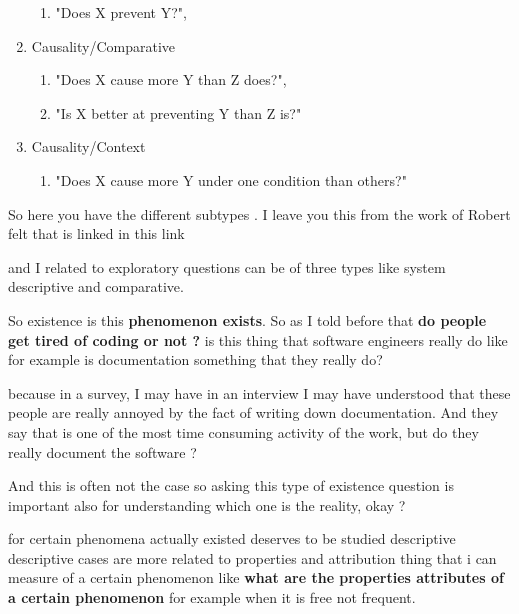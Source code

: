 \documentclass[conference, compsoc, twoside]{IEEEtran}
\begin{document}
\begin{enumerate}
\begin{enumerate}
		\item "Does X prevent Y?",
	\end{enumerate}
	\item Causality/Comparative 
	\begin{enumerate}
		\item "Does X cause more Y than Z does?",
		\item "Is X better at preventing Y than Z is?"
	\end{enumerate}
	\item Causality/Context 
	\begin{enumerate}
		\item "Does X cause more Y under one condition than others?"
	\end{enumerate}

\end{enumerate}
So here you have the different subtypes .
I leave you this from the work of Robert felt that is linked in this link 

and I related to exploratory questions can be of three types like system descriptive and comparative.

So existence is this \textbf{phenomenon exists}.
So as I told before that \textbf{do people get tired of coding or not ?} 
is this thing that software engineers really do like for example is documentation something that they really do? 

because in a survey, 
I may have in an interview
I may have understood that these people are really annoyed by the fact of writing down documentation.
And they say that is one of the most time consuming activity of the work, but do they really document the software ?

And this is often not the case so asking this type of existence question is important also for understanding which one is the reality, okay ? 

for certain phenomena actually existed deserves to be studied descriptive descriptive cases are more related to properties and attribution thing that i can measure of a certain phenomenon like
\textbf{what are the properties attributes of a certain phenomenon} for example when it is free not frequent.
\end{document}
